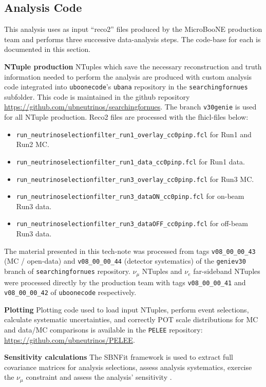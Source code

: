 \subsection{Analysis Code}
\par This analysis uses as input ``reco2'' files produced by the MicroBooNE production team and performs three successive data-analysis steps. The code-base for each is documented in this section.
\par \textbf{NTuple production} NTuples which save the necessary reconstruction and truth information needed to perform the analysis are produced with custom analysis code integrated into \texttt{uboonecode}'s \texttt{ubana} repository in the \texttt{searchingfornues} subfolder. This code is maintained in the github repository \url{https://github.com/ubneutrinos/searchingfornues}. The branch \texttt{v30genie} is used for all NTuple production. Reco2 files are processed with the fhicl-files below:
\begin{itemize}
    \item \texttt{run\_neutrinoselectionfilter\_run1\_overlay\_cc0pinp.fcl} for Run1 and Run2 MC.
    \item \texttt{run\_neutrinoselectionfilter\_run1\_data\_cc0pinp.fcl} for Run1 data.
    \item \texttt{run\_neutrinoselectionfilter\_run3\_overlay\_cc0pinp.fcl} for Run3 MC.
    \item \texttt{run\_neutrinoselectionfilter\_run3\_dataON\_cc0pinp.fcl} for on-beam Run3 data.
    \item \texttt{run\_neutrinoselectionfilter\_run3\_dataOFF\_cc0pinp.fcl} for off-beam Run3 data.
\end{itemize}
The material presented in this tech-note was processed from tags \texttt{v08\_00\_00\_43} (MC / open-data) and \texttt{v08\_00\_00\_44} (detector systematics) of the \texttt{geniev30} branch of \texttt{searchingfornues} repository. $\nu_{\mu}$ NTuples and $\nu_e$ far-sideband NTuples were processed directly by the production team with tags \texttt{v08\_00\_00\_41} and \texttt{v08\_00\_00\_42} of \texttt{uboonecode} respectively.
\par \textbf{Plotting} Plotting code used to load input NTuples, perform event selections, calculate systematic uncertainties, and correctly POT scale distributions for MC and data/MC comparisons is available in the \texttt{PELEE} repository: \url{https://github.com/ubneutrinos/PELEE}.
\par \textbf{Sensitivity calculations} The SBNFit framework is used to extract full covariance matrices for analysis selections, assess analysis systematics, exercise the $\nu_{\mu}$ constraint and assess the analysis' sensitivity \cite{bib:sbnfitgit}.

